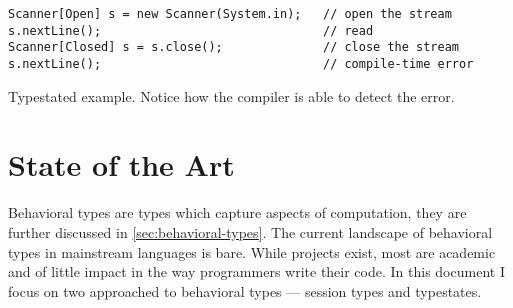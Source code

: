 \begin{listing}
    \begin{verbatim}
Scanner[Open] s = new Scanner(System.in);   // open the stream
s.nextLine();                               // read
Scanner[Closed] s = s.close();              // close the stream
s.nextLine();                               // compile-time error
    \end{verbatim}
    \caption{
        Typestated  example.
        Notice how the compiler is able to detect the error.
    }
    \label{lst:java-scanner-typestate}
\end{listing}

\section{State of the Art}\label{sec:state-of-the-art}

Behavioral types are types which capture aspects of computation, they are further discussed in \autoref{sec:behavioral-types}.
The current landscape of behavioral types in mainstream languages is bare.
While projects exist, most are academic and of little impact in the way programmers write their code.
In this document I focus on two approached to behavioral types --- session types and typestates.

